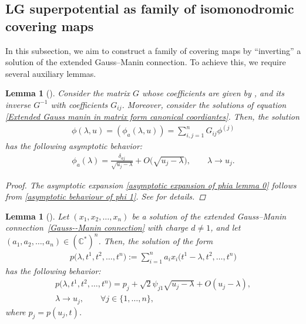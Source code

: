 \documentclass[pdftex]{sigma}
\numberwithin{equation}{section}
\newtheorem{Lemma}[Theorem]{Lemma}
\begin{document}
\subsection{LG superpotential as family of isomonodromic covering maps}

In this subsection, we aim to construct a family of covering maps by ``inverting'' a solution of the extended Gauss--Manin connection. To achieve this, we require several auxiliary lemmas.

\begin{Lemma}[\cite{B.Dubrovin3}]
Consider the matrix \( G \) whose coefficients are given by
,
and its inverse \( G^{-1} \) with coefficients \( G_{ij} \). Moreover, consider the solutions  of equation \eqref{Extended Gauss manin in matrix form canonical coordiantes}. Then, the solution
\begin{gather}\label{phi solution normalized by Gij}
\phi(\lambda,u) = (\phi_a(\lambda,u)) = \sum_{i,j=1}^{n} G_{ij} \phi^{(j)}
\end{gather}
has the following asymptotic behavior:
\begin{gather}\label{asymptotic expansion of phia lemma 0}
 \phi_{a}(\lambda) = \frac{\delta_{aj}}{\sqrt{u_j - \lambda}} + O\bigl(\sqrt{u_j - \lambda}\bigr), \qquad \lambda \to u_j.
\end{gather}

\begin{proof}
The asymptotic expansion \eqref{asymptotic expansion of phia lemma 0} follows from \eqref{asymptotic behaviour of phi 1}. See \cite[Lemma 5.7]{B.Dubrovin3} for details.
\end{proof}
\end{Lemma}


\begin{Lemma}[\cite{B.Dubrovin3}]\label{lemma primitive form}
Let \( (x_1, x_2, \dots, x_n) \) be a solution of the extended Gauss--Manin connection~\eqref{Gauss--Manin connection} with charge \( d \neq 1 \), and let \( (a_1, a_2, \dots, a_n) \in (\mathbb{C}^{*})^n \). Then, the solution of the form
\begin{gather}\label{primitive of volume form}
p\bigl(\lambda, t^1, t^2, \dots, t^n\bigr) := \sum_{i=1}^n a_i x_i\bigl(t^1 - \lambda, t^2, \dots, t^n\bigr)
\end{gather}
has the following behavior:
\begin{gather}
p\bigl(\lambda, t^1, t^2, \dots, t^n\bigr) = p_j + \sqrt{2} \psi_{j1} \sqrt{u_j - \lambda} + O(u_j - \lambda), \nonumber\\
 \lambda \to u_j, \qquad
 \forall j \in \{1, \dots, n\},\label{asymptotic behaviour at the branch locus of p}
\end{gather}
where \( p_j = p(u_j, t) \).
\end{Lemma}
\end{document}
